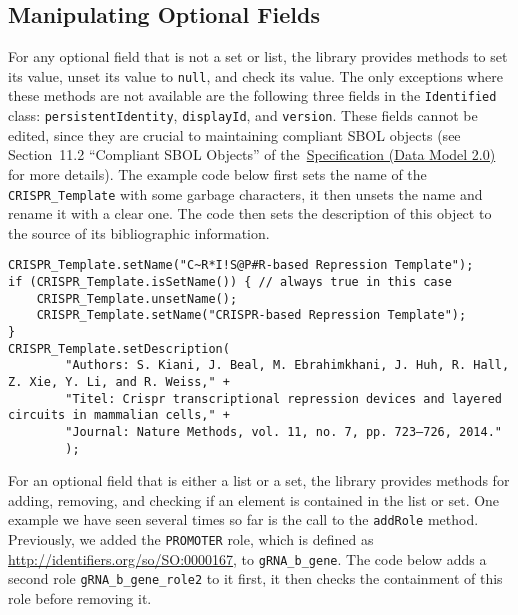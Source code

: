 \subsection*{Manipulating Optional Fields}
For any optional field that is not a set or list, the library provides methods to set its value, unset its value to \lstinline+null+, and check its value. The only exceptions where these methods are not available are the following three fields in the \lstinline+Identified+ class: \lstinline+persistentIdentity+, \lstinline+displayId+, and
\lstinline+version+.  These fields cannot be edited, since they are crucial to maintaining
compliant SBOL objects (see Section~11.2 ``Compliant SBOL Objects'' of the~\href{http://sbolstandard.org/downloads/specification-data-model-2-0/}{Specification
  (Data Model 2.0)} for more details).  The example code below first sets the name of the \lstinline+CRISPR_Template+  with some garbage characters, it then unsets the name and rename it with a clear one. The code then sets the description of this object to the source of its bibliographic information. 

\vspace{\abovedisplayskip}
\begin{minipage}{0.95\textwidth} 
\begin{lstlisting}
CRISPR_Template.setName("C~R*I!S@P#R-based Repression Template");
if (CRISPR_Template.isSetName()) { // always true in this case
	CRISPR_Template.unsetName();
	CRISPR_Template.setName("CRISPR-based Repression Template");
}
CRISPR_Template.setDescription(
        "Authors: S. Kiani, J. Beal, M. Ebrahimkhani, J. Huh, R. Hall, Z. Xie, Y. Li, and R. Weiss," + 
        "Titel: Crispr transcriptional repression devices and layered circuits in mammalian cells," + 
        "Journal: Nature Methods, vol. 11, no. 7, pp. 723–726, 2014."
        );
\end{lstlisting}
\end{minipage}

For an optional field that is either a list or a set, the library provides methods for adding, removing, and checking if an element is contained in the list or set. One example we have seen several times so far is the call to the \lstinline+addRole+ method. Previously, we added the \lstinline+PROMOTER+ role, which is defined as \url{http://identifiers.org/so/SO:0000167}, to \lstinline+gRNA_b_gene+. The code below adds a second role \lstinline+gRNA_b_gene_role2+ to it first, it then checks the containment of this role before removing it. 

